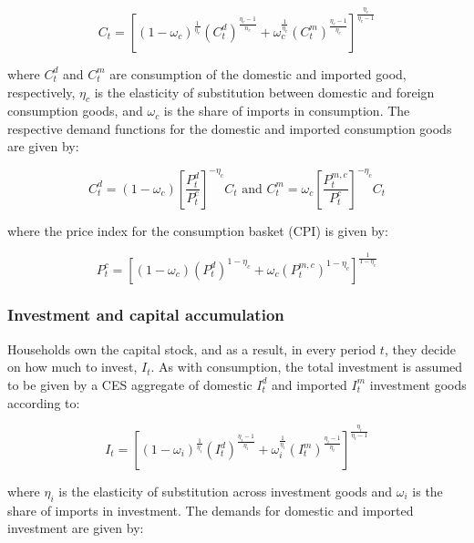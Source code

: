 \documentclass[12pt,oneside,a4paper]{article}
\begin{document}
\begin{equation}
    C_{t}=\left[\left(1-\omega_{c}\right)^{\frac{1}{\eta_{c}}}\left(C_{t}^{d}\right)^{\frac{\eta_{c}-1}{n_{c}}}+\omega_{c}^{\frac{1}{\eta_{c}}}\left(C_{t}^{m}\right)^{\frac{\eta_{c}-1}{\eta_{c}}}\right]^{\frac{\eta_{c}}{\eta_{c}-1}}
\end{equation}

where $C_{t}^{d}$ and $C_{t}^{m}$ are consumption of the domestic and imported good, respectively, $\eta_c$ is the elasticity of substitution between domestic and foreign consumption goods, and $\omega_{c}$ is the share of imports in consumption. The respective demand functions for the domestic and imported consumption goods are given by:

\begin{equation}
\label{Domestic_consumption}
C_{t}^{d} =\left(1-\omega_{c}\right)\left[\frac{P_{t}^{d}}{P_{t}^{c}}\right]^{-\eta_{c}} C_{t} \text {  and  } 
C_{t}^{m} =\omega_{c}\left[\frac{P_{t}^{m, c}}{P_{t}^{c}}\right]^{-\eta_{c}} C_{t}
\end{equation}

where the price index for the consumption basket (CPI) is given by:

\begin{equation}
    P_{t}^{c}=\left[\left(1-\omega_{c}\right)\left(P_{t}^{d}\right)^{1-\eta_{c}}+\omega_{c}\left(P_{t}^{m, c}\right)^{1-\eta_{c}}\right]^{\frac{1}{1-\eta_{c}}}
\end{equation}
\subsubsection{Investment and capital accumulation}
Households own the capital stock, and as a result, in every period $t$, they decide on how much to invest, $I_t$. As with consumption, the total investment is assumed to be given by a CES aggregate of domestic $I_t^{d}$ and imported $I_t^{m}$ investment goods according to:

\begin{equation}
    I_{t}=\left[\left(1-\omega_{i}\right)^{\frac{1}{\eta_{i}}}\left(I_{t}^{d}\right)^{\frac{\eta_{i}-1}{\eta_{i}}}+\omega_{i}^{\frac{1}{\eta_{i}}}\left(I_{t}^{m}\right)^{\frac{\eta_{i}-1}{\eta_{i}}}\right]^{\frac{\eta_{i}}{\eta_{i}-1}}
\end{equation}

where $\eta_{i}$  is the elasticity of substitution across investment goods and $\omega_i$ is the share of imports in investment. The demands for domestic and imported investment are given by:
\end{document}
